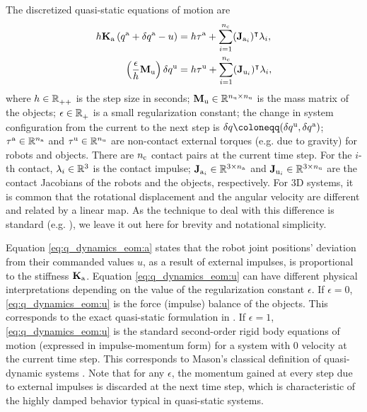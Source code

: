 The discretized quasi-static equations of motion are
\begin{subequations}
\label{eq:q_dynamics_eom}
\begin{align} 
h \Ka \left(\qa + \dqa - u \right) &= h\tauA + \sum_{i=1}^{\nC} (\Ja[i])^\intercal \lambda_i, \label{eq:q_dynamics_eom:a}\\
\left( \frac{\epsilon}{h} \Mu \right) \dqu &= h\tauU + \sum_{i=1}^{\nC} (\Ju[i])^\intercal \lambda_i, \label{eq:q_dynamics_eom:u}
\end{align}
\end{subequations}
where $h \in \R_{++}$ is the step size in seconds; $\Mu \in \R[\nU \times \nU]$ is the mass matrix of the objects; $\epsilon \in \R_{+}$ is a small regularization constant; the change in system configuration from the current to the next step is $\dq \coloneqq (\dqu, \dqa)$; $\tauA \in \R[\nA]$ and $\tauU \in \R[\nU]$ are non-contact external torques (e.g. due to gravity) for robots and objects. There are $\nC$ contact pairs at the current time step. For the $i$-th contact, $\lambda_i \in \R[3]$ is the contact impulse; $\Ja[i] \in \R[3 \times \nA]$ and $\Ju[i] \in \R[3 \times \nU]$ are the contact Jacobians \cite{anitescu1996formulating} of the robots and the objects, respectively. For 3D systems, it is common that the rotational displacement and the angular velocity are different and related by a linear map. As the technique to deal with this difference is standard (e.g. \cite[Section II]{castro2021unconstrained}), we leave it out here for brevity and notational simplicity.

Equation \eqref{eq:q_dynamics_eom:a} states that the robot joint positions' deviation from their commanded values $u$, as a result of external impulses, is proportional to the stiffness $\Ka$. 
Equation \eqref{eq:q_dynamics_eom:u} can have different physical interpretations depending on the value of the regularization constant $\epsilon$.
If $\epsilon = 0$, \eqref{eq:q_dynamics_eom:u} is the force (impulse) balance of the objects. This corresponds to the exact quasi-static formulation in  \cite{pang2021convex}. 
If $\epsilon = 1$, \eqref{eq:q_dynamics_eom:u} is the standard second-order rigid body equations of motion (expressed in impulse-momentum form) for a system with 0 velocity at the current time step. 
This corresponds to Mason's classical definition of quasi-dynamic systems \cite{mason2001mechanics}. 
Note that for any $\epsilon$, the momentum gained at every step due to external impulses is discarded at the next time step, which is characteristic of the highly damped behavior typical in quasi-static systems.

